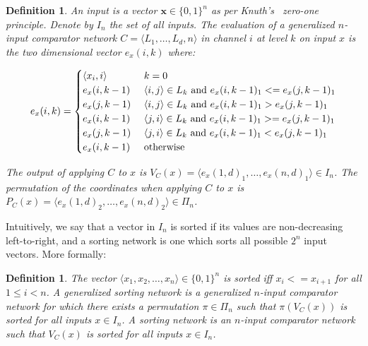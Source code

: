 \documentclass[13pt,a4paper]{article}
\newtheorem{definition}[theorem]{Definition}
\begin{document}
\begin{definition}
\label{def:ComparatorNetworkEvaluation}
An \emph{input} is a vector $\mathbf{x} \in \{0,1\}^n$ as per Knuth's~\cite{Knuth73} zero-one principle. Denote by $I_n$ the set of all inputs. The evaluation of a generalized $n$-input comparator network $C = \langle L_1, \dots, L_d, n \rangle $ in channel $i$ at level $k$ on input $x$ is the two dimensional vector $e_x(i, k)$ where:

\[
 e_x(i, k) =
  \begin{cases} 
	\langle x_i, i \rangle		& \text{ $ k = 0 $}											\\
    e_x(i, k-1)		& \text{ $ \langle i, j \rangle \in L_k $ and $ e_x(i, k-1)_1 <= e_x(j, k-1)_1 $}	\\
    e_x(j, k-1)		& \text{ $ \langle i, j \rangle \in L_k $ and $ e_x(i, k-1)_1 >  e_x(j, k-1)_1  $}	\\
    e_x(i, k-1)		& \text{ $ \langle j, i \rangle \in L_k $ and $ e_x(i, k-1)_1 >= e_x(j, k-1)_1 $}	\\
    e_x(j, k-1)		& \text{ $ \langle j, i \rangle \in L_k $ and $ e_x(i, k-1)_1 <  e_x(j, k-1)_1$}	\\
	e_x(i, k-1)		& \text{ otherwise }										\\
  \end{cases}
\]

The output of applying $C$ to $x$ is \emph{$V_C(x) = \langle e_x(1, d)_1, \dots, e_x(n, d)_1 \rangle \in I_n$}. The permutation of the coordinates when applying $C$ to  $x$ is \emph{$P_C(x) = \langle e_x(1, d)_2, \dots, e_x(n, d)_2 \rangle \in \Pi_n $}.
\end{definition}

Intuitively, we say that a vector in $I_n$ is sorted if its values are non-decreasing left-to-right, and a sorting network is one which sorts all possible $2^n$ input vectors. More formally:

\begin{definition}
\label{SortingNetworkDefinition}
The vector $\langle x_1, x_2, \dots, x_n \rangle \in \{0,1\}^n$ is \emph{sorted} iff $x_i <= x_{i + 1}$ for all $1 \leq i < n$.
A \emph{generalized sorting network} is a generalized $n$-input comparator network for which there exists a permutation $\pi \in \Pi_n$ such that $\pi( V_C(x) )$ is sorted for all inputs $ x \in I_n$.
A \emph{sorting network} is an $n$-input comparator network such that $ V_C( x ) $ is sorted for all inputs $ x \in I_n$.
\end{definition}
\end{document}
